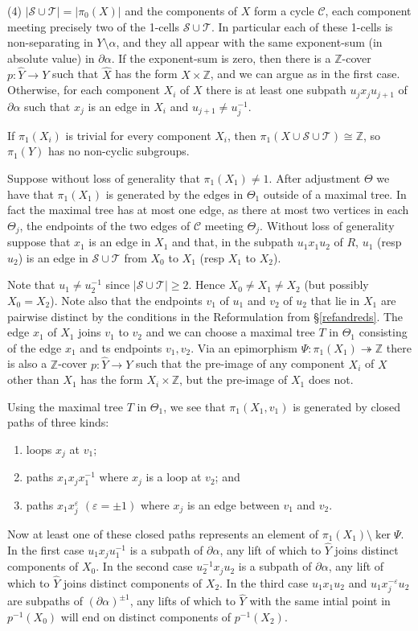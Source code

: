 \documentclass[12pt,a4paper]{amsart}
\def\onto{\twoheadrightarrow}
\def\Z{\mathbb{Z}}
\def\wh{\widehat}
\def\a{\alpha}
\def\cS{\mathcal{S}}
\def\cT{\mathcal{T}}
\begin{document}
\smallskip
\noindent (4) $\vert\cS\cup\cT\vert = \vert\pi_0(X)\vert$ 
and the components of $X$ form a cycle $\mathcal C$, 
each component meeting  precisely two of the 1-cells $\cS\cup\cT$. In particular
each of these 1-cells is non-separating in $Y\setminus\a$, and they all
appear with the same exponent-sum (in absolute value) in $\partial\a$.
If the exponent-sum is zero, then there is a $\Z$-cover $p : \wh Y\to  Y$
such that $\wh X$ 
has the form $X \times \Z$, and we can
argue as in the first case. Otherwise, for each component $X_i$ of
$X$ there is at least one
subpath $u_j x_j u_{j+1}$ of $\partial\a$ such that $x_j$ is an edge 
in  $X_i$ and $u_{j+1} \neq u_j^{-1}$. 

If $\pi_1(X_i)$ is trivial for every component $X_i$, then $\pi_1(X\cup\cS\cup\cT)\cong\Z$,
so $\pi_1(Y)$ has 
no non-cyclic subgroups.   

 Suppose without loss of generality that $\pi_1(X_1)\ne 1$.
After adjustment $\Theta$ we have that $\pi_1(X_1)$ is generated by the edges in $\Theta_1$ 
	outside of a maximal tree. 
	In fact the maximal tree  has at most one edge, as there at most two vertices in each $\Theta_j$, the endpoints of the two edges of $\mathcal C$ meeting $\Theta_j$. 
Without loss of generality suppose that $x_1$ is an edge  
in $X_1$ and that, 
 in the subpath $u_1x_1u_2$ of $R$, $u_1$ (resp $u_2$) is an edge in $\cS\cup\cT$ from $X_0$ to $X_1$ (resp $X_1$ to $X_2$).  

 Note that $u_1\ne u_2^{-1}$ since $|\cS\cup\cT|\ge 2$. Hence $X_0\ne X_1\ne X_2$ (but possibly $X_0=X_2$). Note also that the endpoints $v_1$ of $u_1$ and $v_2$ of $u_2$ that lie in $X_1$ are pairwise distinct by the conditions in the Reformulation from \S \ref{refandreds}. The edge $x_1$ of $X_1$ joins $v_1$ to $v_2$ and we can choose a maximal tree $T$ in $\Theta_1$ consisting of the edge $x_1$ and ts endpoints $v_1,v_2$.
Via an epimorphism  $\Psi:\pi_1(X_1)\onto \Z$ there is also a $\Z$-cover $p : \wh Y\to Y$
such that the pre-image of any component $X_i$ of $X$ other than
$X_1$ has the form $X_i\times\Z$, but the pre-image of $X_1$ does not. 

Using the maximal tree $T$ in $\Theta_1$, we see that $\pi_1(X_1,v_1)$ is generated by closed paths of three kinds:
\begin{enumerate}
\item loops $x_j$ at $v_1$;
\item paths $x_1 x_j x_1^{-1}$ where $x_j$ is a loop at $v_2$; and
\item paths $x_1 x_j^\varepsilon$ $(\varepsilon=\pm1)$ where $x_j$ is an edge between $v_1$ and $v_2$.
\end{enumerate} 
Now at least one of these closed paths represents an element of $\pi_1(X_1)\setminus\ker\Psi$.  In the first case $u_1x_ju_1^{-1}$ is a subpath of $\partial\a$, any lift of which to $\wh Y$ joins distinct components of $X_0$.
In the second case $u_2^{-1}x_ju_2$ is a subpath of $\partial\a$, any lift of which to $\wh Y$ joins distinct components of $X_2$.  In the third case $u_1x_1u_2$ and $u_1x_j^{-\varepsilon}u_2$ are subpaths of $(\partial\a)^{\pm1}$, any lifts of which to $\wh Y$ with the same intial point in $p^{-1}(X_0)$ will end on distinct components of $p^{-1}(X_2)$.
\end{document}
